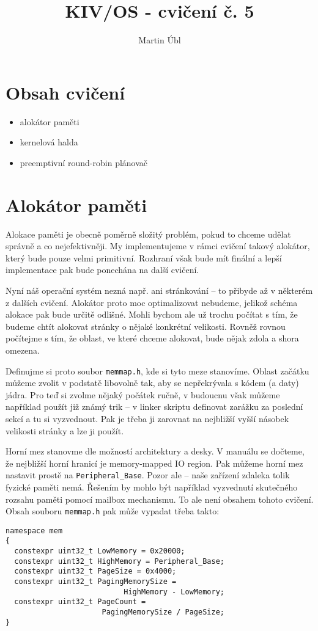 \documentclass{article}
\author{Martin Úbl}
\title{KIV/OS - cvičení č. 5}
\begin{document}
\maketitle



\section{Obsah cvičení}

\begin{itemize}
	\item alokátor paměti
	\item kernelová halda
	\item preemptivní round-robin plánovač
\end{itemize}

\section{Alokátor paměti}

Alokace paměti je obecně poměrně složitý problém, pokud to chceme udělat správně a co nejefektivněji. My implementujeme v rámci cvičení takový alokátor, který bude pouze velmi primitivní. Rozhraní však bude mít finální a lepší implementace pak bude ponechána na další cvičení.

Nyní náš operační systém nezná např. ani stránkování -- to přibyde až v některém z dalších cvičení. Alokátor proto moc optimalizovat nebudeme, jelikož schéma alokace pak bude určitě odlišné. Mohli bychom ale už trochu počítat s tím, že budeme chtít alokovat stránky o nějaké konkrétní velikosti. Rovněž rovnou počítejme s tím, že oblast, ve které chceme alokovat, bude nějak zdola a shora omezena.

Definujme si proto soubor \texttt{memmap.h}, kde si tyto meze stanovíme. Oblast začátku můžeme zvolit v podstatě libovolně tak, aby se nepřekrývala s kódem (a daty) jádra. Pro teď si zvolme nějaký počátek ručně, v budoucnu však můžeme například použít již známý trik -- v linker skriptu definovat zarážku za poslední sekcí a tu si vyzvednout. Pak je třeba ji zarovnat na nejbližší vyšší násobek velikosti stránky a lze ji použít.

Horní mez stanovme dle možností architektury a desky. V manuálu se dočteme, že nejbližší horní hranicí je memory-mapped IO region. Pak můžeme horní mez nastavit prostě na \texttt{Peripheral\_Base}. Pozor ale -- naše zařízení zdaleka tolik fyzické paměti nemá. Řešením by mohlo být například vyzvednutí skutečného rozsahu paměti pomocí mailbox mechanismu. To ale není obsahem tohoto cvičení.
\newpage
Obsah souboru \texttt{memmap.h} pak může vypadat třeba takto:
\begin{lstlisting}
namespace mem
{
  constexpr uint32_t LowMemory = 0x20000;
  constexpr uint32_t HighMemory = Peripheral_Base;
  constexpr uint32_t PageSize = 0x4000;
  constexpr uint32_t PagingMemorySize =
                           HighMemory - LowMemory;
  constexpr uint32_t PageCount =
                      PagingMemorySize / PageSize;
}
\end{lstlisting}
\end{document}
